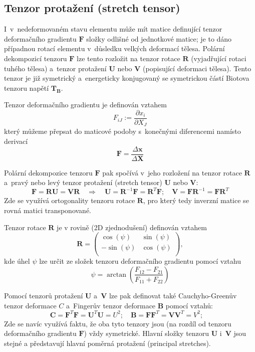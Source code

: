 
\subsection{Tenzor protažení (stretch tensor)}
I~v~nedeformovaném stavu elementu může mít matice definující tenzor deformačního gradientu $\bm{F}$ složky odlišné od jednotkové matice; je to dáno případnou rotací elementu v~důsledku velkých deformací tělesa.  Polární dekompozicí tenzoru $\bm{F}$ lze tento rozložit na tenzor rotace $\bm{R}$ (vyjadřující rotaci tuhého tělesa) a~tenzor protažení $\bm{U}$ nebo $\bm{V}$ (popisující deformaci tělesa). Tento tenzor je již symetrický a~energeticky konjugovaný se symetrickou částí Biotova tenzoru napětí $\bm{T_B}$. 

Tenzor deformačního gradientu je definován vztahem
\begin{equation}
	F_{iJ} := \frac{\partial x_i}{\partial X_J}
\end{equation}
který můžeme přepsat do maticové podoby s~konečnými diferencemi namísto derivací
\begin{equation}
	\bm{F} = \frac{\Delta \bm{x}}{\Delta \bm{X}}
\end{equation}

Polární dekompozice tenzoru $\bm{F}$ pak spočívá v~jeho rozložení na tenzor 
rotace $\bm{R}$ a~pravý nebo levý tenzor protažení (stretch tensor) $\bm{U}$ nebo $\bm{V}$:
\begin{equation}
	\bm{F} = \bm{R} \bm{U} = \bm{V} \bm{R}
	\quad\Rightarrow\quad
	\bm{U} = \bm{R}^{-1} \bm{F} = \bm{R}^T \bm{F};
	\quad
	\bm{V} = \bm{F} \bm{R}^{-1} = \bm{F} \bm{R}^T
\end{equation}
Zde se využívá ortogonality tenzoru rotace $\bm{R}$, pro který tedy inverzní matice se rovná matici transponované.

Tenzor rotace $\bm{R}$ je v rovině (2D zjednodušení) definován vztahem
\begin{equation}
	\bm{R} = \left(\begin{matrix}
		\cos(\psi) & \sin(\psi)\\
		-\sin(\psi) & \cos(\psi)\\
	\end{matrix}\right),
\end{equation}
kde úhel $\psi$ lze určit ze složek tenzoru deformačního gradientu pomocí vztahu
\begin{equation}
	\psi = \arctan\left(\frac{F_{12} - F_{21}}{F_{11} + F_{22}}\right)
\end{equation}

Pomocí tenzorů protažení $\bm{U}$ a~$\bm{V}$ lze pak definovat také Cauchyho-Greenův tenzor deformace $C$ a~Fingerův tenzor deformace $\bm{B}$ pomocí vztahů:
\begin{equation}
	\bm{C} = \bm{F}^T \bm{F} = \bm{U}^T \bm{U} = U^2; \quad
	\bm{B} = \bm{F} \bm{F}^T = \bm{V} \bm{V}^T = V^2; \quad
\end{equation}
Zde se navíc využívá faktu, že oba tyto tenzory jsou (na rozdíl od tenzoru deformačního gradientu $\bm{F}$) vždy symetrické. Hlavní složky tenzoru $\bm{U}$ i~$\bm{V}$ jsou stejné a představují hlavní poměrná protažení (principal stretches). 
